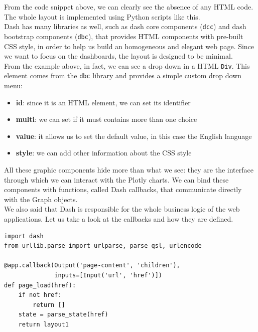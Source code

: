 From the code snippet above, we can clearly see the absence of any HTML code.
The whole layout is implemented using Python scripts like this.\\
Dash has many libraries as well, such as dash core components (\verb#dcc#) and dash bootstrap components (\verb#dbc#), that provides HTML components with pre-built CSS style, in order to help us build an homogeneous and  elegant web page. Since we want to focus on the dashboards, the layout is designed to be minimal.\\
From the example above, in fact, we can see a drop down in a HTML \verb#Div#. This element comes from the \verb#dbc# library and provides a simple custom drop down menu:
\begin{itemize}
    \item \textbf{id}: since it is an HTML element, we can set its identifier
    \item \textbf{multi}: we can set if it must contains more than one choice
    \item \textbf{value}: it allows us to set the default value, in this case the English language
    \item \textbf{style}: we can add other information about the CSS style
\end{itemize}

All these graphic components hide more than what we see: they are the interface through which we can interact with the Plotly charts.
We can bind these components with functions, called Dash callbacks, that communicate directly with the Graph objects.\\
We also said that Dash is responsible for the whole business logic of the web applications. Let us take a look at the callbacks and how they are defined.

\lstset{frame=lines}
\lstset{basicstyle=\footnotesize}
\lstset{caption=Dash callback for URL update}
\begin{lstlisting}
import dash
from urllib.parse import urlparse, parse_qsl, urlencode

@app.callback(Output('page-content', 'children'),
              inputs=[Input('url', 'href')])
def page_load(href):
    if not href:
        return []
    state = parse_state(href)
    return layout1
    
\end{lstlisting}

